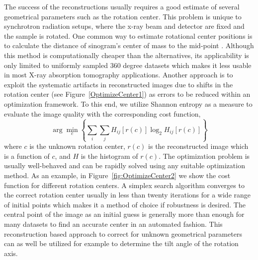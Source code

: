 \documentclass[pdf]{iucr}              %
\begin{document}
The success of the reconstructions usually requires a good estimate of several geometrical parameters such as the rotation center. This problem is unique to synchrotron radiation setups, where the x-ray beam and detector are fixed and the sample is rotated. One common way to estimate rotational center positions is to calculate the distance of sinogram's center of mass to the mid-point \cite{Azevedo}. Although this method is computationally cheaper than the alternatives, its applicability is only limited to uniformly sampled 360 degree datasets which makes it less usable in most X-ray absorption tomography applications. Another approach is to exploit the systematic artifacts in reconstructed images due to shifts in the rotation center \cite{donath_spie_2006} (see Figure~\ref{OptimizeCenter1}) as errors to be reduced within an optimization framework. To this end, we utilize Shannon entropy as a measure to evaluate the image quality with the corresponding cost function,
\begin{equation}
\arg \min_c \left\{\sum_i \sum_jH_{ij}\left[r(c)\right]\log_2 H_{ij}\left[r(c)\right]\right\}
\end{equation}
where $c$ is the unknown rotation center, $r(c)$ is the reconstructed image which is a function of $c$, and $H$ is the histogram of $r(c)$. The optimization problem is usually well-behaved and can be rapidly solved using any suitable optimization method.  As an example, in Figure~\ref{fig:OptimizeCenter2} we show the cost function for different rotation centers. A simplex search algorithm converges to the correct rotation center usually in less than twenty iterations for a wide range of initial points which makes it a method of choice if robustness is desired. The central point of the image as an initial guess is generally more than enough for many datasets to find an accurate center in an automated fashion. This reconstruction based approach to correct for unknown geometrical parameters can as well be utilized for example to determine the tilt angle of the rotation axis.
\end{document}
